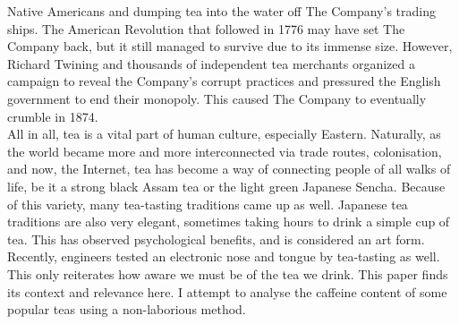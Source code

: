 \documentclass[11pt]{article}
\begin{document}
Native Americans and dumping tea into the water off The Company's trading ships.
The American Revolution that followed in 1776 may have set The Company back, but it still managed to
survive due to its immense size. However, Richard Twining and thousands of independent tea merchants
organized a campaign to reveal the Company's corrupt practices and pressured the English government
to end their monopoly. This caused The Company to eventually crumble in 1874. \cite{eicboston} \\
All in all, tea is a vital part of human culture, especially Eastern. Naturally, as the world became
more and more interconnected via trade routes, colonisation, and now, the Internet, tea has become a
way of connecting people of all walks of life, be it a strong black Assam tea or the light green
Japanese Sencha. Because of this variety, many tea-tasting traditions came up as well. Japanese tea
traditions are also very elegant, sometimes taking hours to drink a simple cup of tea. This has
observed psychological benefits, and is considered an art form. \cite{ceremony} \\
Recently, engineers tested an electronic nose and tongue by tea-tasting as
well. \cite{electronicnose} \\
This only reiterates how aware we must be of the tea we drink. This paper finds its
context and relevance here. I attempt to analyse the caffeine content of some popular teas using a
non-laborious method.\\
\end{document}
